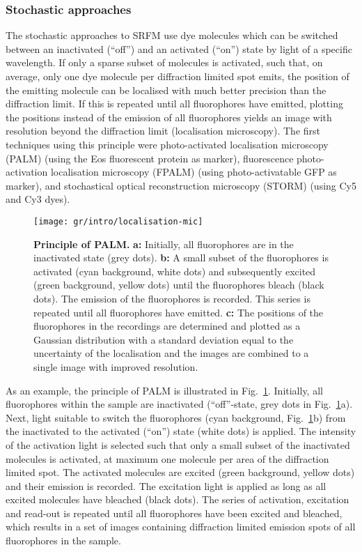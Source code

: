 \subsubsection{Stochastic approaches}
\label{sec:smlm}
The stochastic approaches to SRFM use dye molecules which can be switched
between an inactivated (``off'') and an activated (``on'') state by light of a
specific wavelength. If only a sparse subset of molecules is activated, such
that, on average, only one dye molecule per diffraction limited spot emits,
the position of the emitting molecule can be localised with much better
precision than the diffraction limit. If this is repeated until all
fluorophores have emitted, plotting the positions instead of the emission of
all fluorophores yields an image with resolution beyond the diffraction
limit (localisation microscopy). The first techniques using this principle
were photo-activated localisation microscopy (PALM) \cite{Betzig2006} (using
the Eos fluorescent protein \cite{Wiedenmann2004} as marker), fluorescence
photo-activation localisation microscopy (FPALM) \cite{Hess2006} (using
photo-activatable GFP as marker), and stochastical
optical reconstruction microscopy (STORM) \cite{Rust2006} (using Cy5 and Cy3
dyes).

\begin{figure}
  \centering
  \texttt{[image: gr/intro/localisation-mic]}
  \caption{%
    \textbf{Principle of PALM.}
    \textbf{a:} Initially, all fluorophores are in the inactivated state (grey
    dots).
    \textbf{b:} A small subset of the fluorophores is activated (cyan
    background, white dots) and subsequently excited (green background, yellow
    dots) until the fluorophores bleach (black dots). The emission of the
    fluorophores is recorded. This series is repeated until all fluorophores
    have emitted.
    \textbf{c:} The positions of the fluorophores in the recordings are
    determined and plotted as a Gaussian distribution with a standard
    deviation equal to the uncertainty of the localisation and the 
    images are combined to a single image with improved resolution.
  }
  \label{fig:lm}
\end{figure}

As an example, the principle of PALM is illustrated in Fig.~\ref{fig:lm}. Initially,
all fluorophores within the sample are inactivated (``off''-state, grey dots
in Fig.~\ref{fig:lm}a). Next, light suitable to switch the fluorophores (cyan
background, Fig.~\ref{fig:lm}b) from the inactivated to the activated (``on'')
state (white dots) is applied. The intensity of the activation light is
selected such that only a small subset of the inactivated molecules is
activated, at maximum one molecule per area of the diffraction limited
spot. The activated molecules are excited (green background, yellow dots) and
their emission is recorded. The excitation light is applied as long as all
excited molecules have bleached (black dots). The series of activation,
excitation and read-out is repeated until all fluorophores have been excited
and bleached, which results in a set of images containing diffraction limited
emission spots of all fluorophores in the sample.

